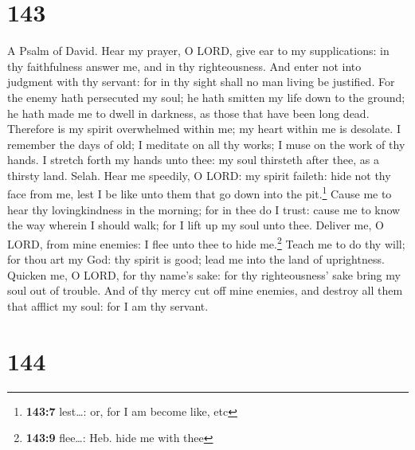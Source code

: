 \hypertarget{section-144}{%
\section{143}\label{section-144}}

A Psalm of David.  Hear my prayer, O LORD, give ear to my
supplications: in thy faithfulness answer me, and in thy righteousness.
 And enter not into judgment with thy servant: for in thy
sight shall no man living be justified.  For the enemy
hath persecuted my soul; he hath smitten my life down to the ground; he
hath made me to dwell in darkness, as those that have been long dead.
 Therefore is my spirit overwhelmed within me; my heart
within me is desolate.  I remember the days of old; I
meditate on all thy works; I muse on the work of thy hands.
 I stretch forth my hands unto thee: my soul thirsteth
after thee, as a thirsty land. Selah.  Hear me speedily, O
LORD: my spirit faileth: hide not thy face from me, lest I be like unto
them that go down into the pit.\footnote{\textbf{143:7} lest\ldots: or,
  for I am become like, etc}  Cause me to hear thy
lovingkindness in the morning; for in thee do I trust: cause me to know
the way wherein I should walk; for I lift up my soul unto thee.
 Deliver me, O LORD, from mine enemies: I flee unto thee
to hide me.\footnote{\textbf{143:9} flee\ldots: Heb. hide me with thee}
 Teach me to do thy will; for thou art my God: thy spirit
is good; lead me into the land of uprightness.  Quicken
me, O LORD, for thy name's sake: for thy righteousness' sake bring my
soul out of trouble.  And of thy mercy cut off mine
enemies, and destroy all them that afflict my soul: for I am thy
servant.

\hypertarget{section-145}{%
\section{144}\label{section-145}}

